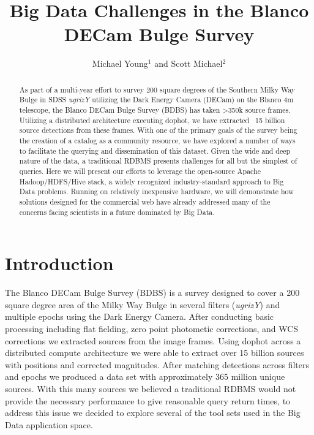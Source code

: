 \documentclass[11pt,twoside]{article}
\begin{document}
\title{Big Data Challenges in the Blanco DECam Bulge Survey}
\author{Michael Young$^1$ and Scott Michael$^2$
}


\begin{abstract}
As part of a multi-year effort to survey 200 square degrees of the Southern Milky Way Bulge in SDSS
\textit{ugrizY} utilizing the Dark Energy Camera (DECam) on the Blanco 4m telescope, the Blanco DECam Bulge
Survey (BDBS) has taken >350k source frames. Utilizing a distributed architecture executing dophot, we have
extracted ~15 billion source detections from these frames. With one of the primary goals of the survey being
the creation of a catalog as a community resource, we have explored a number of ways to facilitate the
querying and dissemination of this dataset. Given the wide and deep nature of the data, a traditional RDBMS
presents challenges for all but the simplest of queries. Here we will present our efforts to leverage the
open-source Apache Hadoop/HDFS/Hive stack, a widely recognized industry-standard approach to Big Data
problems. Running on relatively inexpensive hardware, we will demonstrate how solutions designed for the
commercial web have already addressed many of the concerns facing scientists in a future dominated by Big Data.
\end{abstract}

\section{Introduction}

The Blanco DECam Bulge Survey (BDBS) is a survey designed to cover a 200 square degree area of the Milky Way
Bulge in several filters (\textit{ugrizY}) and multiple epochs using the Dark Energy Camera. After conducting
basic processing including flat fielding, zero point photometic corrections, and WCS corrections we extracted
sources from the image frames. Using dophot across a distributed compute architecture we were able to extract
over 15 billion sources with positions and corrected magnitudes. After matching detections across filters and
epochs we produced a data set with approximately 365 million unique sources. With this many sources we
believed a traditional RDBMS would not provide the necessary performance to give reasonable query return
times, to address this issue we decided to explore several of the tool sets used in the Big Data application space.
\end{document}
